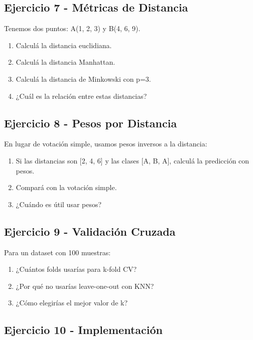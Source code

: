 \documentclass[12pt]{article}
\begin{document}
\subsection{Ejercicio 7 - Métricas de Distancia}

Tenemos dos puntos: A(1, 2, 3) y B(4, 6, 9).

\begin{enumerate}
    \item Calculá la distancia euclidiana.
    \item Calculá la distancia Manhattan.
    \item Calculá la distancia de Minkowski con p=3.
    \item ¿Cuál es la relación entre estas distancias?
\end{enumerate}

\subsection{Ejercicio 8 - Pesos por Distancia}

En lugar de votación simple, usamos pesos inversos a la distancia:

\begin{enumerate}
    \item Si las distancias son [2, 4, 6] y las clases [A, B, A], calculá la predicción con pesos.
    \item Compará con la votación simple.
    \item ¿Cuándo es útil usar pesos?
\end{enumerate}

\subsection{Ejercicio 9 - Validación Cruzada}

Para un dataset con 100 muestras:

\begin{enumerate}
    \item ¿Cuántos folds usarías para k-fold CV?
    \item ¿Por qué no usarías leave-one-out con KNN?
    \item ¿Cómo elegirías el mejor valor de k?
\end{enumerate}

\subsection{Ejercicio 10 - Implementación}
\end{document}
